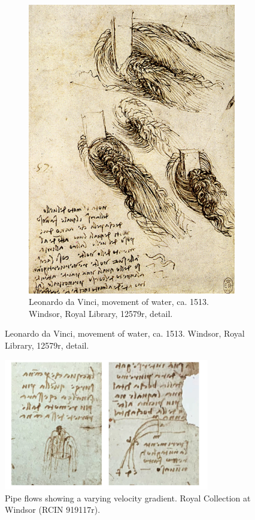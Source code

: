 \documentclass[12pt]{article}
\begin{document}
\begin{figure}[!htb]
\begin{subfigure}{0.45\textwidth}
		\includegraphics[height=0.4\textheight]{LdV_2}
		\caption{Leonardo da Vinci, movement of water, ca. 1513.  Windsor, Royal Library, 12579r, detail.}
		\label{fig:2}
	\end{subfigure}
\end{figure}


\begin{figure}[!htb]
	\centering
	\includegraphics[width=0.8\textwidth]{LdV_5}
	\caption{Pipe flows showing a varying velocity gradient. Royal Collection at Windsor (RCIN 919117r).}
	\label{fig:5}
\end{figure}
\end{document}
